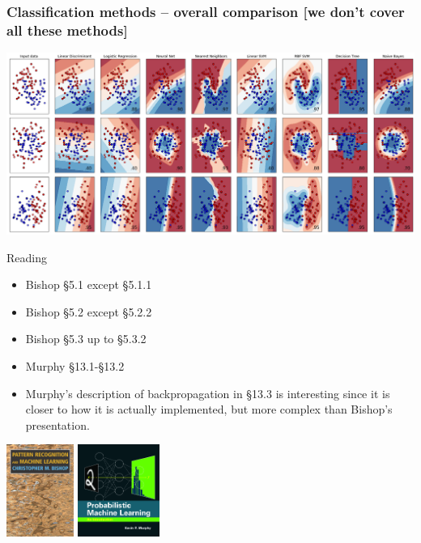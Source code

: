 \documentclass[10pt]{beamer}
\begin{document}
\begin{frame}[fragile]
\frametitle{Classification methods -- overall comparison \small [we
  don't cover all these methods]}

\centerline{\includegraphics[scale=0.25]{figures/classifiers_comparison.png}}
\end{frame}
\begin{titledslide}{Reading}

  \begin{itemize}
  \item Bishop \S5.1 except \S5.1.1
  \item Bishop \S5.2 except \S5.2.2
  \item Bishop \S5.3 up to \S5.3.2
  \item Murphy \S13.1-\S13.2
  \item Murphy's description of backpropagation in \S13.3 is
    interesting since it is closer to how it is actually implemented,
    but more complex than Bishop's presentation.
  \end{itemize}
  \vspace{1em}
  \centering
  \includegraphics[height=3cm]{figures/bishop.jpg}\hspace{4 em}%
  \includegraphics[height=3cm]{figures/murphy.jpg}
  
\end{titledslide}
\end{document}
